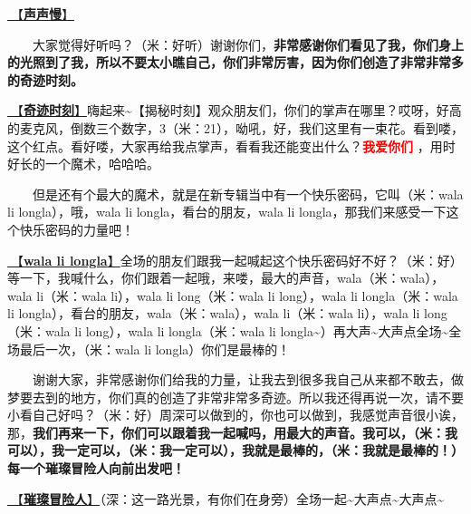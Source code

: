 \documentclass[]{ctexbook}
\begin{document}
\hyperref[say-slowly]{🎵【\textbf{声声慢}】}

  大家觉得好听吗？（米：好听）谢谢你们，\textbf{非常感谢你们看见了我，你们身上的光照到了我，所以不要太小瞧自己，你们非常厉害，因为你们创造了非常非常多的奇迹时刻。}

\hyperref[magic-moment]{🎵【\textbf{奇迹时刻}】}嗨起来\textasciitilde【揭秘时刻】观众朋友们，你们的掌声在哪里？哎呀，好高的麦克风，倒数三个数字，3（米：21），呦吼，好，我们这里有一束花。看到喽，这个红点。看好喽，大家再给我点掌声，看看我还能变出什么？\textbf{\textcolor{red}{我爱你们} }，用时好长的一个魔术，哈哈哈。

  但是还有个最大的魔术，就是在新专辑当中有一个快乐密码，它叫（米：wala li longla），哦，wala li longla，看台的朋友，wala li longla，那我们来感受一下这个快乐密码的力量吧！

\hyperref[wala-li-longla]{🎵【\textbf{wala li longla}】}全场的朋友们跟我一起喊起这个快乐密码好不好？（米：好）等一下，我喊什么，你们跟着一起哦，来喽，最大的声音，wala（米：wala），wala li（米：wala li），wala li long（米：wala li long），wala li longla（米：wala li longla），看台的朋友，wala（米：wala），wala li（米：wala li），wala li long（米：wala li long），wala li longla（米：wala li longla\textasciitilde）再大声\textasciitilde 大声点全场\textasciitilde 全场最后一次，（米：wala li longla）你们是最棒的！

  谢谢大家，非常感谢你们给我的力量，让我去到很多我自己从来都不敢去，做梦要去到的地方，你们真的创造了非常非常多奇迹。所以我还得再说一次，请不要小看自己好吗？（米：好）周深可以做到的，你也可以做到，我感觉声音很小诶，那，\textbf{我们再来一下，你们可以跟着我一起喊吗，用最大的声音。我可以，（米：我可以），我一定可以，（米：我一定可以），我就是最棒的，（米：我就是最棒的！）每一个璀璨冒险人向前出发吧！}

\hyperref[adventurers]{🎵【\textbf{璀璨冒险人}】}（深：这一路光景，有你们在身旁）全场一起\textasciitilde 大声点\textasciitilde 大声点\textasciitilde{}
\end{document}
